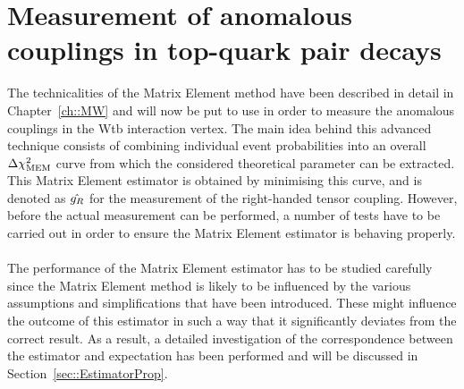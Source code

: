 \chapter{Measurement of anomalous couplings in top-quark pair decays} \label{ch::Analysis}

The technicalities of the Matrix Element method have been described in detail in Chapter~\ref{ch::MW} and will now be put to use in order to measure the anomalous couplings in the Wtb interaction vertex.
The main idea behind this advanced technique consists of combining individual event probabilities into an overall $\Delta \chi^{2}_{\textrm{MEM}}$ curve from which the considered theoretical parameter can be extracted.
This Matrix Element estimator is obtained by minimising this curve, and is denoted as $\hat{g_{R}}$ for the measurement of the right-handed tensor coupling.
However, before the actual measurement can be performed, a number of tests have to be carried out in order to ensure the Matrix Element estimator is behaving properly.
\\
\\
The performance of the Matrix Element estimator has to be studied carefully since the Matrix Element method is likely to be influenced by the various assumptions and simplifications that have been introduced.
These might influence the outcome of this estimator in such a way that it significantly deviates from the correct result.
As a result, a detailed investigation of the correspondence between the estimator and expectation has been performed and will be discussed in Section~\ref{sec::EstimatorProp}.
